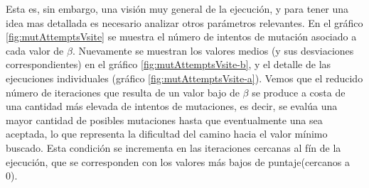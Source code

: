 Esta es, sin embargo, una visión muy general de la ejecución, y para tener una idea mas detallada es necesario analizar otros parámetros relevantes.
En el gráfico \ref{fig:mutAttemptsVsite} se muestra el número de intentos de mutación asociado a cada valor de $\beta$.
Nuevamente se muestran los valores medios (y sus desviaciones correspondientes) en el gráfico \ref{fig:mutAttemptsVsite-b}, y el detalle de las ejecuciones individuales (gráfico \ref{fig:mutAttemptsVsite-a}).
Vemos que el reducido número de iteraciones que resulta de un valor bajo de $\beta$ se produce a costa de una cantidad más elevada de intentos de mutaciones, es decir, se evalúa una mayor cantidad de posibles mutaciones hasta 
que eventualmente una sea aceptada, lo que representa la dificultad del camino hacia el valor mínimo buscado. 
Esta condición se incrementa en las iteraciones cercanas al fín de la ejecución, que se corresponden con los valores más bajos de puntaje(cercanos a 0). 




